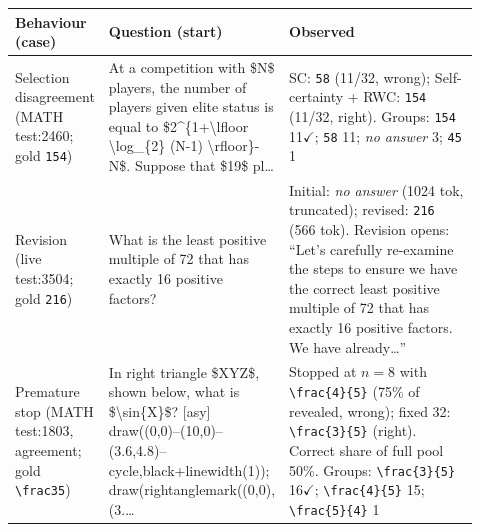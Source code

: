 \begin{tabular}{@{}>{\raggedright\arraybackslash}p{0.14\linewidth}>{\raggedright\arraybackslash}p{0.28\linewidth}>{\raggedright\arraybackslash}p{0.5\linewidth}@{}}
\toprule
Behaviour (case) & Question (start) & Observed \\
\midrule
Selection disagreement (MATH test:2460; gold \texttt{154}) & At a competition with \$N\$ players, the number of players given elite status is equal to \$2\textasciicircum{}\{1+\textbackslash{}lfloor \textbackslash{}log\_\{2\} (N-1) \textbackslash{}rfloor\}-N\$. Suppose that \$19\$ pl\ldots & SC: \texttt{58} (11/32, wrong); Self-certainty + RWC: \texttt{154} (11/32, right). Groups: \texttt{154} 11$\checkmark$; \texttt{58} 11; \textit{no answer} 3; \texttt{45} 1 \\
Revision (live test:3504; gold \texttt{216}) & What is the least positive multiple of 72 that has exactly 16 positive factors? & Initial: \textit{no answer} (1024 tok, truncated); revised: \texttt{216} (566 tok). Revision opens: ``Let's carefully re-examine the steps to ensure we have the correct least positive multiple of 72 that has exactly 16 positive factors. We have already\ldots'' \\
Premature stop (MATH test:1803, agreement; gold \texttt{\textbackslash{}frac35}) & In right triangle \$XYZ\$, shown below, what is \$\textbackslash{}sin\{X\}\$? [asy] draw((0,0)--(10,0)--(3.6,4.8)--cycle,black+linewidth(1)); draw(rightanglemark((0,0),(3.\ldots & Stopped at $n=8$ with \texttt{\textbackslash{}frac\{4\}\{5\}} (75\% of revealed, wrong); fixed 32: \texttt{\textbackslash{}frac\{3\}\{5\}} (right). Correct share of full pool 50\%. Groups: \texttt{\textbackslash{}frac\{3\}\{5\}} 16$\checkmark$; \texttt{\textbackslash{}frac\{4\}\{5\}} 15; \texttt{\textbackslash{}frac\{5\}\{4\}} 1 \\
\bottomrule
\end{tabular}